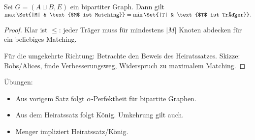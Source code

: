 \begin{st}[König, 1931]
    Sei $G = (A \sqcup B, E)$ ein bipartiter Graph.
    Dann gilt
    \begin{math}
        \max\Set{|M| & \text{$M$ ist Matching}}
        = \min \Set{|T| & \text{$T$ ist Träger}}.
    \end{math}
    \begin{proof}
        Klar ist $\le$: jeder Träger muss für mindestens $|M|$ Knoten abdecken für ein beliebiges Matching.

        Für die umgekehrte Richtung: Betrachte den Beweis des Heiratssatzes.
        Skizze: Bobs/Alices, finde Verbesserungsweg, Widerspruch zu maximalem Matching.
    \end{proof}
\end{st}

\begin{ex}
    Übungen:
    \begin{itemize}
        \item
            Aus vorigem Satz folgt $\alpha$-Perfektheit für bipartite Graphen.
        \item
            Aus dem Heiratssatz folgt König.
            Umkehrung gilt auch.
        \item
            Menger impliziert Heiratssatz/König.
    \end{itemize}
\end{ex}
